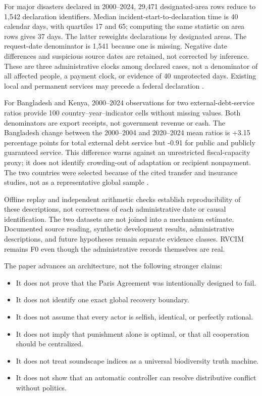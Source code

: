 \documentclass[11pt,a4paper]{article}
\numberwithin{equation}{section}
\theoremstyle{definition}
\theoremstyle{plain}
\theoremstyle{remark}
\begin{document}
For major disasters declared in 2000--2024, 29,471 designated-area rows reduce to 1,542 declaration identifiers. Median incident-start-to-declaration time is 40 calendar days, with quartiles 17 and 65; computing the same statistic on area rows gives 37 days. The latter reweights declarations by designated areas. The request-date denominator is 1,541 because one is missing. Negative date differences and suspicious source dates are retained, not corrected by inference. These are three administrative clocks among declared cases, not a denominator of all affected people, a payment clock, or evidence of 40 unprotected days. Existing local and permanent services may precede a federal declaration \citep{fema2026data}.

For Bangladesh and Kenya, 2000--2024 observations for two external-debt-service ratios provide 100 country--year--indicator cells without missing values. Both denominators are export receipts, not government revenue or cash. The Bangladesh change between the 2000--2004 and 2020--2024 mean ratios is +3.15 percentage points for total external debt service but -0.91 for public and publicly guaranteed service. This difference warns against an unrestricted fiscal-capacity proxy; it does not identify crowding-out of adaptation or recipient nonpayment. The two countries were selected because of the cited transfer and insurance studies, not as a representative global sample \citep{worldbanktotal,worldbankpublic}.

Offline replay and independent arithmetic checks establish reproducibility of these descriptions, not correctness of each administrative date or causal identification. The two datasets are not joined into a mechanism estimate. Documented source reading, synthetic development results, administrative descriptions, and future hypotheses remain separate evidence classes. RVCIM remains F0 even though the administrative records themselves are real.

The paper advances an architecture, not the following stronger claims:
\begin{itemize}
  \item It does not prove that the Paris Agreement was intentionally designed to fail.
  \item It does not identify one exact global recovery boundary.
  \item It does not assume that every actor is selfish, identical, or perfectly rational.
  \item It does not imply that punishment alone is optimal, or that all cooperation should be centralized.
  \item It does not treat soundscape indices as a universal biodiversity truth machine.
  \item It does not show that an automatic controller can resolve distributive conflict without politics.
\end{itemize}
\end{document}
